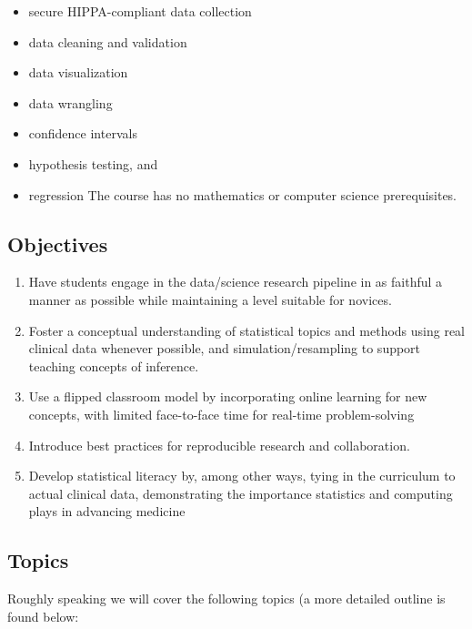 \documentclass[
]{book}
\providecommand{\tightlist}{%
  \setlength{\itemsep}{0pt}\setlength{\parskip}{0pt}}
\begin{document}
\begin{itemize}
\tightlist
\item
  secure HIPPA-compliant data collection
\item
  data cleaning and validation
\item
  data visualization
\item
  data wrangling
\item
  confidence intervals
\item
  hypothesis testing, and
\item
  regression
  The course has no mathematics or computer science prerequisites.
\end{itemize}

\hypertarget{objectives}{%
\subsection{Objectives}\label{objectives}}

\begin{enumerate}
\def\labelenumi{\arabic{enumi}.}
\tightlist
\item
  Have students engage in the data/science research pipeline in as faithful a manner as possible while maintaining a level suitable for novices.
\item
  Foster a conceptual understanding of statistical topics and methods using real clinical data whenever possible, and simulation/resampling to support teaching concepts of inference.
\item
  Use a flipped classroom model by incorporating online learning for new concepts, with limited face-to-face time for real-time problem-solving
\item
  Introduce best practices for reproducible research and collaboration.
\item
  Develop statistical literacy by, among other ways, tying in the curriculum to actual clinical data, demonstrating the importance statistics and computing plays in advancing medicine
\end{enumerate}

\hypertarget{topics}{%
\subsection{Topics}\label{topics}}

Roughly speaking we will cover the following topics (a more detailed outline is found below:
\end{document}
